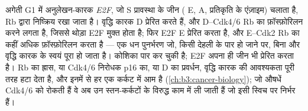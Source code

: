 \begin{proposition}[निर्बंधन बिंदु एक स्विच है]\label{prop:b3:cell-cycle-apoptosis:rb}
अगेती G1 में अनुलेखन-कारक \emph{E2F}, जो S प्रावस्था के जीन ( E,
 A, प्रतिकृति के एंज़ाइम) चलाता है, \emph{} Rb द्वारा निष्क्रिय रखा जाता है। वृद्धि कारक  D प्रेरित
करते हैं, और  D--Cdk4/6 Rb का फ़ॉस्फ़ोरिलन करने लगता है, जिससे
थोड़ा E2F मुक्त होता है; फिर E2F  E प्रेरित करता है, और 
E--Cdk2 Rb का कहीं अधिक फ़ॉस्फ़ोरिलन करता है --- एक धन पुनर्भरण जो, किसी
देहली के पार हो जाने पर, बिना और वृद्धि कारक के स्वयं पूरा हो जाता है।
कोशिका  पार कर चुकी है; E2F अपना ही जीन भी प्रेरित करता
है। Rb का ह्रास, या Cdk4/6 निरोधक p16 का, या  D का प्रवर्धन,
वृद्धि कारक की आवश्यकता पूरी तरह हटा देता है, और इनमें से हर एक कर्कट
में आम है (\cref{ch:b3:cancer-biology}); जो औषधें Cdk4/6 को रोकती हैं
वे अब उन स्तन-कर्कटों के विरुद्ध काम में ली जाती हैं जो इसी स्विच पर
निर्भर हैं।
\end{proposition}

